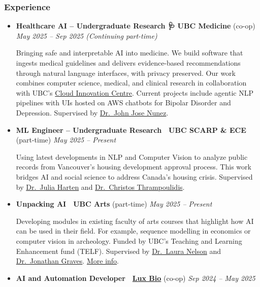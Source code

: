 \documentclass[
  11pt,
]{article}
\begin{document}
\subsubsection{Experience}\label{experience}

\begin{itemize}
\item
  \textbf{Healthcare AI -- Undergraduate Research 🩺} \textbar{}
  \textbf{UBC Medicine} (co-op) \textbar{} \emph{May 2025 -- Sep 2025
  (Continuing part-time)}

  Bringing safe and interpretable AI into medicine. We build software
  that ingests medical guidelines and delivers evidence-based
  recommendations through natural language interfaces, with privacy
  preserved. Our work combines computer science, medical, and clinical
  research in collaboration with UBC's \href{https://cic.ubc.ca/}{Cloud
  Innovation Centre}. Current projects include agentic NLP pipelines
  with UIs hosted on AWS chatbots for Bipolar Disorder and Depression.
  Supervised by
  \href{https://www.google.com/search?q=john+jose+nunez}{Dr.~John Jose
  Nunez}.
\item
  \textbf{ML Engineer -- Undergraduate Research 🏡} \textbar{}
  \textbf{UBC SCARP \& ECE} (part-time) \textbar{} \emph{May 2025 --
  Present}

  Using latest developments in NLP and Computer Vision to analyze public
  records from Vancouver's housing development approval process. This
  work bridges AI and social science to address Canada's housing crisis.
  Supervised by
  \href{https://scarp.ubc.ca/directory/julia-harten}{Dr.~Julia Harten}
  and \href{https://ece.ubc.ca/christos-thrampoulidis/}{Dr.~Christos
  Thrampoulidis}.
\item
  \textbf{Unpacking AI 🎨} \textbar{} \textbf{UBC Arts} (part-time)
  \textbar{} \emph{May 2025 -- Present}

  Developing modules in existing faculty of arts courses that highlight
  how AI can be used in their field. For example, sequence modelling in
  economics or computer vision in archeology. Funded by UBC's Teaching
  and Learning Enhancement fund (TELF). Supervised by
  \href{https://sociology.ubc.ca/profile/laura-nelson/}{Dr.~Laura
  Nelson} and
  \href{https://economics.ubc.ca/profile/jonathan-graves/}{Dr.~Jonathan
  Graves}. \href{https://github.com/ubcecon/praxis-ubc}{More info}.
\item
  \textbf{AI and Automation Developer 🧬} \textbar{}
  \href{https://www.luxbio.ca/}{\textbf{Lux Bio}} (co-op) \textbar{}
  \emph{Sep 2024 -- May 2025}


\end{itemize}
\end{document}
